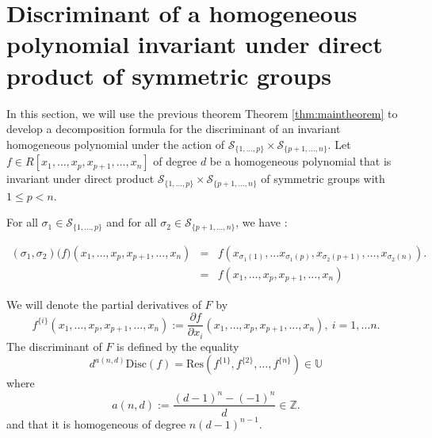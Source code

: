 \documentclass[12pt,a4paper,reqno]{amsart}
\theoremstyle{definition}
\theoremstyle{remark}
\numberwithin{equation}{section}
\newcommand {\ZZ}{\mathbb{Z}}
\newcommand{\Res}{\mathrm{Res}}
\newcommand{\Disc}{\mathrm{Disc}}
\newcommand{\UU}{\mathbb{U}}
\begin{document}
\section{Discriminant of a homogeneous polynomial invariant under direct product of symmetric groups }\label{sec:discriminant}

In this section, we will use the previous theorem  Theorem {\ref{thm:maintheorem}} to  develop  a decomposition formula for the discriminant of an invariant homogeneous polynomial under the action of  $\mathcal{S}_{\{1
,\ldots,p\}}\times\mathcal{S}_{\{p+1
,\ldots,n\}}.$ 
Let $f \in R[x_1,\ldots,x_p,x_{p+1},\ldots,x_n]$ of degree $d$ be a homogeneous polynomial that is invariant under direct product  $\mathcal{S}_{\{1
,\ldots,p\}}\times\mathcal{S}_{\{p+1
,\ldots,n\}} $ of symmetric groups with $1\leq p< n$.

For all $\sigma_1\in \mathcal{S}_{\{1
,\ldots,p\}}$ and for all $\sigma_2\in \mathcal{S}_{\{p+1
,\ldots,n\}}$, we have :


\begin{eqnarray}
(\sigma_1,\sigma_2)\Big(f \Big)(x_1,\ldots,x_p,x_{p+1},\ldots,x_n) &=&f(x_{\sigma_1(1)},\ldots x_{\sigma_1(p)},x_{\sigma_2(p+1)},\ldots,x_{\sigma_2(n)}). \\
 &=& f(x_1,\ldots,x_p,x_{p+1},\ldots,x_n)
\end{eqnarray}

We  will denote the partial derivatives of $F$ by
$$f^{\{i\}}(x_1,\ldots,x_p,x_{p+1},\ldots,x_n):=\frac{\partial f}{\partial x_{i}} (x_1,\ldots,x_p,x_{p+1},\ldots,x_n), \ i=1,\ldots n .$$ 
The discriminant of $F$ is defined by the equality
\begin{equation}\label{eq:discressym}
d^{a(n,d)}\Disc(f)=\Res\left(  f^{\{1\}},f^{\{2\}},\ldots,f^{\{n\}} \right) \in \UU
\end{equation} where 
$$a(n,d):=\frac{(d-1)^{n}-(-1)^{n}}{d} \in \ZZ.$$
and that it is homogeneous of degree $n(d-1)^{n-1}$.
\end{document}
